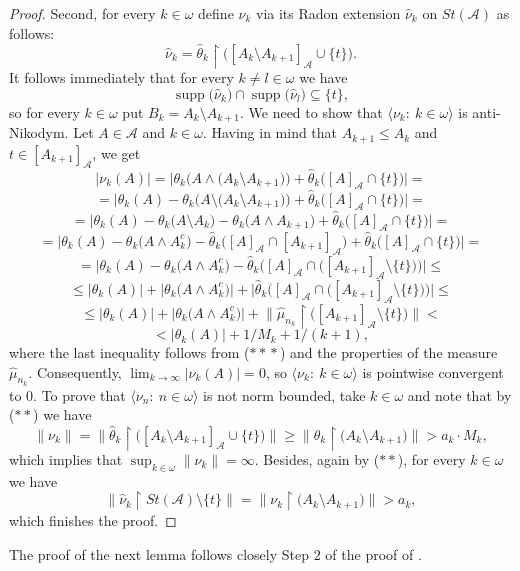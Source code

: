 \documentclass[a4paper,11pt,fleqn]{amsart}
\theoremstyle{definition}
\theoremstyle{remark}
\numberwithin{equation}{section}
\newcommand{\N}{\mathbb{N}}
\newcommand{\aA}{\mathcal{A}}
\newcommand{\rstr}{\restriction}
\newcommand{\sm}{\setminus}
\newcommand{\sub}{\subseteq}
\DeclareMathOperator{\supp}{supp}
\newcommand{\wh}{\widehat}
\newcommand{\seqn}[1]{\big\langle#1\colon\ n\io\big\rangle}
\newcommand{\seqk}[1]{\big\langle#1\colon\ k\io\big\rangle}
\newcommand{\clopen}[1]{\left[#1\right]}
\newcommand{\iA}{\in\aA}
\newcommand{\io}{\in\omega}%
\begin{document}
\begin{proof}
Second, for every $k\io$ define $\nu_k$ via its Radon extension $\wh{\nu}_k$ on $St(\aA)$ as follows:
\[\wh{\nu}_k=\wh{\theta}_k\rstr\big(\clopen{A_k\sm A_{k+1}}_\aA\cup\{t\}\big).\]
It follows immediately that for every $k\neq l\io$ we have
\[\supp\big(\wh{\nu}_k\big)\cap\supp\big(\wh{\nu}_l\big)\sub\{t\},\]
so for every $k\io$ put $B_k=A_k\sm A_{k+1}$. We need to show that $\seqk{\nu_k}$ is anti-Nikodym. Let $A\iA$ and $k\io$. Having in mind that $A_{k+1}\le A_k$ and $t\in\clopen{A_{k+1}}_\aA$, we get
\[\big|\nu_k(A)\big|=\big|\theta_k\big(A\wedge \big(A_k\sm A_{k+1}\big)\big)+\wh{\theta}_k\big(\clopen{A}_\aA\cap\{t\}\big)\big|=\]
\[=\big|\theta_k(A)-\theta_k\big(A\sm\big(A_k\sm A_{k+1}\big)\big)+\wh{\theta}_k\big(\clopen{A}_\aA\cap\{t\}\big)\big|=\]
\[=\big|\theta_k(A)-\theta_k\big(A\sm A_k\big)-\theta_k\big(A\wedge A_{k+1}\big)+\wh{\theta}_k\big(\clopen{A}_\aA\cap\{t\}\big)\big|=\]
\[=\big|\theta_k(A)-\theta_k\big(A\wedge A_k^c\big)-\wh{\theta}_k\big(\clopen{A}_\aA\cap \clopen{A_{k+1}}_\aA\big)+\wh{\theta}_k\big(\clopen{A}_\aA\cap\{t\}\big)\big|=\]
\[=\big|\theta_k(A)-\theta_k\big(A\wedge A_k^c\big)-\wh{\theta}_k\Big(\clopen{A}_\aA\cap\big(\clopen{A_{k+1}}_\aA\sm\{t\}\big)\Big)\big|\le\]
\[\le\big|\theta_k(A)\big|+\big|\theta_k\big(A\wedge A_k^c\big)\big|+\big|\wh{\theta}_k\Big(\clopen{A}_\aA\cap\big(\clopen{A_{k+1}}_\aA\sm\{t\}\big)\Big)\big|\le\]
\[\le\big|\theta_k(A)\big|+\big|\theta_k\big(A\wedge A_k^c\big)\big|+\big\|\wh{\mu}_{n_k}\rstr\big(\clopen{A_{k+1}}_\aA\sm\{t\}\big)\big\|<\]
\[<\big|\theta_k(A)\big|+1/{M_k}+1/(k+1),\]
where the last inequality follows from ($*\!*\!*$) and the properties of the measure $\wh{\mu}_{n_k}$. Consequently, $\lim_{k\to\infty}\big|\nu_k(A)\big|=0$,
so $\seqk{\nu_k}$ is pointwise convergent to $0$. To prove that $\seqn{\nu_n}$ is not norm bounded, take $k\io$ and note that by ($**$) we have
\[\big\|\nu_k\big\|=\big\|\wh{\theta}_k\rstr\big(\clopen{A_k\sm A_{k+1}}_\aA\cup\{t\}\big)\big\|\ge\big\|\theta_k\rstr\big(A_k\sm A_{k+1}\big)\big\|>a_k\cdot M_k,\]
which implies that $\sup_{k\io}\big\|\nu_k\big\|=\infty$. Besides, again by ($**$), for every $k\io$ we have
\[\big\|\wh{\nu}_k\rstr St(\aA)\sm\{t\}\big\|=\big\|\nu_k\rstr\big(A_k\sm A_{k+1}\big)\big\|>a_k,\]
which finishes the proof.
\end{proof}

The proof of the next lemma follows closely Step $2$ of the proof of \cite[Proposition 3.2]{Zuc25}.
\end{document}
